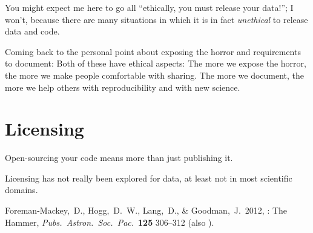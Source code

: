 \documentclass[12pt,twoside,pdftex]{article}
\begin{document}
You might expect me here to go all ``ethically, you must release your
data!''; I won't, because there are many situations in which it is in
fact \emph{unethical} to release data and code.

Coming back to the personal point about exposing the horror and
requirements to document: Both of these have ethical aspects: The more
we expose the horror, the more we make people comfortable with
sharing. The more we document, the more we help others with
reproducibility and with new science.

\section{Licensing}

Open-sourcing your code means more than just publishing it.

Licensing has not really been explored for data, at least not in most
scientific domains.

\clearpage
{}\theendnotes

\clearpage
\raggedright
\begin{thebibliography}{}
  Foreman-Mackey,~D., Hogg,~D.~W., Lang,~D., \& Goodman,~J.\ 2012,
  : The  Hammer,
  \textit{Pubs.\ Astron.\ Soc.\ Pac.}\ \textbf{125} 306--312
  (also ).
\end{thebibliography}
\end{document}
